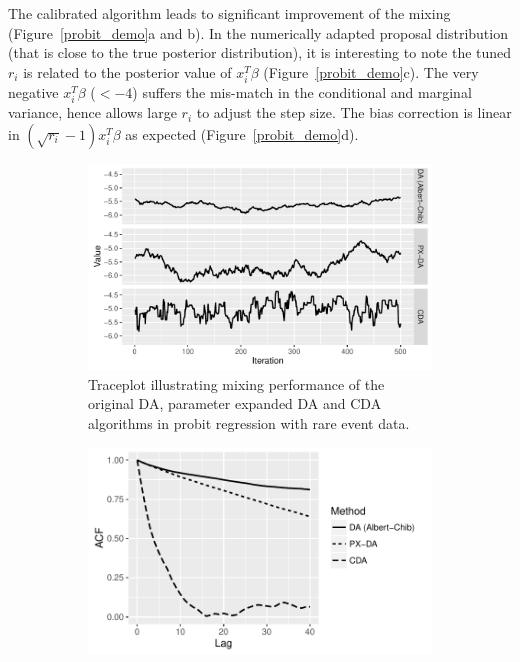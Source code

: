 \documentclass[10pt]{article}
\newcommand{\xbeta}{ x_i^T \beta}
\begin{document}
 The calibrated algorithm leads to significant improvement of the mixing (Figure~\ref{probit_demo}a and b). In the numerically adapted proposal distribution (that is close to the true posterior distribution), it is interesting to note the tuned $r_i$ is related to the posterior value of $\xbeta$ (Figure~\ref{probit_demo}c). The very negative $\xbeta$ ($< -4$) suffers the mis-match in the conditional and marginal variance, hence allows large $r_i$ to adjust the step size. The bias correction is linear in $(\sqrt{r_i}-1 ) \xbeta$ as expected (Figure~\ref{probit_demo}d).
 
 
\begin{figure}[H]
  \begin{subfigure}[b]{0.49\textwidth}
 \includegraphics[width=1\textwidth]{probit15_trace_plot.pdf}
  \caption{Traceplot illustrating mixing performance of the original DA, parameter expanded DA and CDA algorithms in probit regression with rare event data.}
\end{subfigure}
  \hfill
   \begin{subfigure}[b]{0.49\textwidth}
 \includegraphics[width=1\textwidth]{probit15_acf.pdf}

\end{subfigure}
\end{figure}
\end{document}
